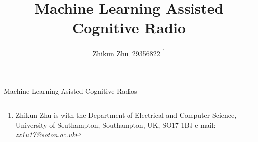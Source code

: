 \documentclass[journal]{IEEEtran}
\begin{document}
%
\title{Machine Learning Assisted Cognitive Radio}
%
%
%

\author{Zhikun Zhu, 29356822
\thanks{Zhikun Zhu is with the Department
of Electrical and Computer Science, University of Southampton, Southampton,
UK, SO17 1BJ  e-mail: \textsl{zz1u17@soton.ac.uk}}}

%
%



%
{Machine Learning Asisted Cognitive Radios }
%




\end{document}
